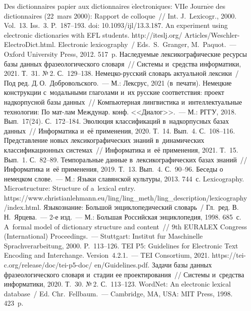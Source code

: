 \begin{multicols}{2}
{{\begin{thebibliography}{99}
 Des dictionnaires papier aux dictionnaires $\acute{\mbox{e}}$lectroniques: VIIe 
Journ$\acute{\mbox{e}}$e des dictionnaires (22~mars 2000): Rapport de colloque~// Int. 
J.~Lexicogr., 2000. Vol.~13. Iss.~3. P.~187--193. doi: 10.1093/ijl/13.3.187.
 An experiment using electronic dictionaries with EFL students. {\sf 
http://iteslj.org/ Articles/Weschler-ElectroDict.html}.
Electronic lexicography~/
Eds.\ S.~Granger, M.~Paquot.~--- Oxford University Press, 2012. 517~p.
 Наследуемые лексикографические ресурсы базы 
данных фразеологического словаря~// Системы и~средства информатики, 2021. Т.~31. №\,2. 
С.~129--138.
Немецко-рус\-ский словарь актуальной лексики~/
Под ред. Д.\,О.~Добровольского.~--- М.: Лексрус, 2021 (в~пе\-чати).
 Немецкие конструкции с~модальными 
глаголами и~их русские соответствия: проект надкорпусной базы данных~//\linebreak 
Компьютерная лингвистика и~интеллектуальные технологии: По мат-лам Междунар. 
конф. <<Диалог>>.~--- М.: РГГУ, 2018. Вып.~17(24). С.~172--184.
 Эволюция классификаций 
в~надкорпусных базах данных~// Информатика и~её применения, 2020. Т.~14. Вып.~4. 
С.~108--116.
 Пред\-став\-ле\-ние новых 
лексикографических знаний в~динамических классификационных системах~// 
Информатика и~её применения, 2021. Т.~15. Вып.~1. С.~82--89.
 Темпоральные данные 
в~лексикографических базах знаний~// Информатика и~её применения, 2019. Т.~13. 
Вып.~4. С.~90--96.
 Беседы о немецком слове.~--- М.: Языки славянской культуры, 
2013. 744~с.
 Lexicography. Microstructure: Structure of a~lexical entry. {\sf 
https://www.\linebreak christianlehmann.eu/ling/ling\_meth/ling\_description/\linebreak lexicography/index.html}.
Языкознание: Большой энциклопедический словарь~/ Гл.\ ред. В.\,Н.~Ярцева.~---  2-е 
изд.~--- М.: Большая Российская энциклопедия, 1998. 685~с.
 A~formal model of dictionary structure and content~// 9th 
EURALEX Congress (International) Proceedings.~--- Stuttgart: Institut f$\ddot{\mbox{u}}$r 
Maschinelle Sprachverarbeitung, 2000. P.~113--126.
TEI P5: Guidelines for Electronic Text Encoding and Interchange. Version~4.2.1.~--- TEI 
Consortium, 2021. {\sf https://tei-c.org/release/doc/tei-p5-doc/ en/Guidelines.pdf}.
 Задачи базы данных 
фразеологического словаря и~стадии ее проектирования~// Системы и~средства 
информатики, 2020. Т.~30. №\,2. С.~113--123.
WordNet: An electronic lexical database~/ Ed. Chr.~Fellbaum.~--- Cambridge, MA, USA: MIT Press, 
1998. 423~p.



\end{thebibliography}}}
\end{multicols}
